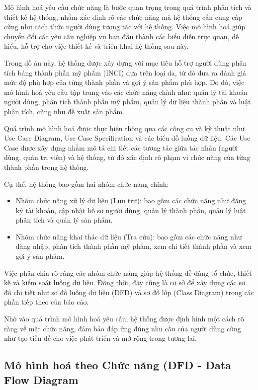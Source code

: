 \documentclass[12pt,a4paper]{article}
\begin{document}
Mô hình hoá yêu cầu chức năng là bước quan trọng trong quá trình phân tích và thiết kế hệ thống, nhằm xác định rõ các chức năng mà hệ thống cần cung cấp cũng như cách thức người dùng tương tác với hệ thống. Việc mô hình hoá giúp chuyển đổi các yêu cầu nghiệp vụ ban đầu thành các biểu diễn trực quan, dễ hiểu, hỗ trợ cho việc thiết kế và triển khai hệ thống sau này.

Trong đồ án này, hệ thống được xây dựng với mục tiêu hỗ trợ người dùng phân tích bảng thành phần mỹ phẩm (INCI) dựa trên loại da, từ đó đưa ra đánh giá mức độ phù hợp của từng thành phần và gợi ý sản phẩm phù hợp. Do đó, việc mô hình hoá yêu cầu tập trung vào các chức năng chính như: quản lý tài khoản người dùng, phân tích thành phần mỹ phẩm, quản lý dữ liệu thành phần và luật phân tích, cũng như đề xuất sản phẩm.

Quá trình mô hình hoá được thực hiện thông qua các công cụ và kỹ thuật như Use Case Diagram, Use Case Specification và các biểu đồ luồng dữ liệu. Các Use Case được xây dựng nhằm mô tả chi tiết các tương tác giữa tác nhân (người dùng, quản trị viên) và hệ thống, từ đó xác định rõ phạm vi chức năng của từng thành phần trong hệ thống.

Cụ thể, hệ thống bao gồm hai nhóm chức năng chính:
\begin{itemize}
\item Nhóm chức năng xử lý dữ liệu (Lưu trữ): bao gồm các chức năng như đăng ký tài khoản, cập nhật hồ sơ người dùng, quản lý thành phần, quản lý luật phân tích và quản lý sản phẩm.
\item Nhóm chức năng khai thác dữ liệu (Tra cứu): bao gồm các chức năng như đăng nhập, phân tích thành phần mỹ phẩm, xem chi tiết thành phần và xem gợi ý sản phẩm.
\end{itemize}

Việc phân chia rõ ràng các nhóm chức năng giúp hệ thống dễ dàng tổ chức, thiết kế và kiểm soát luồng dữ liệu. Đồng thời, đây cũng là cơ sở để xây dựng các sơ đồ chi tiết như sơ đồ luồng dữ liệu (DFD) và sơ đồ lớp (Class Diagram) trong các phần tiếp theo của báo cáo.

Nhờ vào quá trình mô hình hoá yêu cầu, hệ thống được định hình một cách rõ ràng về mặt chức năng, đảm bảo đáp ứng đúng nhu cầu của người dùng cũng như tạo tiền đề cho việc phát triển và mở rộng trong tương lai.

\subsection{Mô hình hoá theo Chức năng (DFD - Data Flow Diagram}
\end{document}
